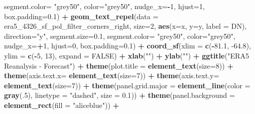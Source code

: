 \documentclass[12pt,twoside]{reedthesis}
\newenvironment{Shaded}{\begin{snugshade}}{\end{snugshade}}
\newcommand{\DataTypeTok}[1]{\textcolor[rgb]{0.13,0.29,0.53}{#1}}
\newcommand{\DecValTok}[1]{\textcolor[rgb]{0.00,0.00,0.81}{#1}}
\newcommand{\FloatTok}[1]{\textcolor[rgb]{0.00,0.00,0.81}{#1}}
\newcommand{\KeywordTok}[1]{\textcolor[rgb]{0.13,0.29,0.53}{\textbf{#1}}}
\newcommand{\NormalTok}[1]{#1}
\newcommand{\OperatorTok}[1]{\textcolor[rgb]{0.81,0.36,0.00}{\textbf{#1}}}
\newcommand{\OtherTok}[1]{\textcolor[rgb]{0.56,0.35,0.01}{#1}}
\newcommand{\StringTok}[1]{\textcolor[rgb]{0.31,0.60,0.02}{#1}}
\begin{document}
\begin{Shaded}
\begin{Highlighting}[]
   \DataTypeTok{segment.color=} \StringTok{"grey50"}\NormalTok{, }\DataTypeTok{color=}\StringTok{"grey50"}\NormalTok{, }\DataTypeTok{nudge_x=}\OperatorTok{-}\DecValTok{1}\NormalTok{, }\DataTypeTok{hjust=}\DecValTok{1}\NormalTok{, }\DataTypeTok{box.padding=}\FloatTok{0.1}\NormalTok{) }\OperatorTok{+}
\StringTok{  }\KeywordTok{geom_text_repel}\NormalTok{(}\DataTypeTok{data =}\NormalTok{ era5_}\DecValTok{4326}\NormalTok{_sf_pol_filter_corners_right, }\DataTypeTok{size=}\DecValTok{2}\NormalTok{, }\KeywordTok{aes}\NormalTok{(}\DataTypeTok{x=}\NormalTok{x, }\DataTypeTok{y=}\NormalTok{y, }\DataTypeTok{label =}\NormalTok{ DN), }\DataTypeTok{direction=}\StringTok{"y"}\NormalTok{, }\DataTypeTok{segment.size=}\FloatTok{0.1}\NormalTok{, }
   \DataTypeTok{segment.color=} \StringTok{"grey50"}\NormalTok{, }\DataTypeTok{color=}\StringTok{"grey50"}\NormalTok{, }\DataTypeTok{nudge_x=}\OperatorTok{+}\DecValTok{1}\NormalTok{, }\DataTypeTok{hjust=}\DecValTok{0}\NormalTok{, }\DataTypeTok{box.padding=}\FloatTok{0.1}\NormalTok{) }\OperatorTok{+}
\StringTok{  }\KeywordTok{coord_sf}\NormalTok{(}\DataTypeTok{xlim =} \KeywordTok{c}\NormalTok{(}\OperatorTok{-}\FloatTok{81.1}\NormalTok{, }\FloatTok{-64.8}\NormalTok{), }\DataTypeTok{ylim =} \KeywordTok{c}\NormalTok{(}\OperatorTok{-}\DecValTok{5}\NormalTok{, }\DecValTok{13}\NormalTok{), }\DataTypeTok{expand =} \OtherTok{FALSE}\NormalTok{) }\OperatorTok{+}
\StringTok{  }\KeywordTok{xlab}\NormalTok{(}\StringTok{""}\NormalTok{) }\OperatorTok{+}\StringTok{ }
\StringTok{  }\KeywordTok{ylab}\NormalTok{(}\StringTok{""}\NormalTok{) }\OperatorTok{+}\StringTok{ }
\StringTok{  }\KeywordTok{ggtitle}\NormalTok{(}\StringTok{"ERA5 Reanalysis - Forecast"}\NormalTok{) }\OperatorTok{+}
\StringTok{  }\KeywordTok{theme}\NormalTok{(}\DataTypeTok{plot.title =} \KeywordTok{element_text}\NormalTok{(}\DataTypeTok{size=}\DecValTok{8}\NormalTok{)) }\OperatorTok{+}
\StringTok{  }\KeywordTok{theme}\NormalTok{(}\DataTypeTok{axis.text.x=} \KeywordTok{element_text}\NormalTok{(}\DataTypeTok{size=}\DecValTok{7}\NormalTok{)) }\OperatorTok{+}\StringTok{ }
\StringTok{  }\KeywordTok{theme}\NormalTok{(}\DataTypeTok{axis.text.y=} \KeywordTok{element_text}\NormalTok{(}\DataTypeTok{size=}\DecValTok{7}\NormalTok{)) }\OperatorTok{+}
\StringTok{  }\KeywordTok{theme}\NormalTok{(}\DataTypeTok{panel.grid.major =} \KeywordTok{element_line}\NormalTok{(}\DataTypeTok{color =} \KeywordTok{gray}\NormalTok{(.}\DecValTok{5}\NormalTok{), }\DataTypeTok{linetype =} \StringTok{"dashed"}\NormalTok{, }\DataTypeTok{size =} \FloatTok{0.1}\NormalTok{)) }\OperatorTok{+}
\StringTok{  }\KeywordTok{theme}\NormalTok{(}\DataTypeTok{panel.background =} \KeywordTok{element_rect}\NormalTok{(}\DataTypeTok{fill =} \StringTok{"aliceblue"}\NormalTok{)) }\OperatorTok{+}

\end{Highlighting}
\end{Shaded}
\end{document}
